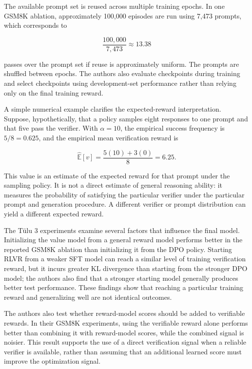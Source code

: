 The available prompt set is reused across multiple training epochs. In one
GSM8K ablation, approximately 100,000 episodes are run using 7,473 prompts,
which corresponds to

\begin{equation}
    \frac{100{,}000}{7{,}473}
    \approx 13.38
    \label{eq:rlvr-prompt-reuse}
\end{equation}

passes over the prompt set if reuse is approximately uniform. The prompts
are shuffled between epochs. The authors also evaluate checkpoints during
training and select checkpoints using development-set performance rather
than relying only on the final training reward.

A simple numerical example clarifies the expected-reward interpretation.
Suppose, hypothetically, that a policy samples eight responses to one prompt
and that five pass the verifier. With \(\alpha=10\), the empirical success
frequency is \(5/8=0.625\), and the empirical mean verification reward is

\begin{equation}
    \widehat{\mathbb{E}}[v]
    =
    \frac{5(10)+3(0)}{8}
    =
    6.25.
    \label{eq:rlvr-worked-reward}
\end{equation}

This value is an estimate of the expected reward for that prompt under the
sampling policy. It is not a direct estimate of general reasoning ability:
it measures the probability of satisfying the particular verifier under the
particular prompt and generation procedure. A different verifier or prompt
distribution can yield a different expected reward.

The Tülu 3 experiments examine several factors that influence the final
model. Initializing the value model from a general reward model performs
better in the reported GSM8K ablation than initializing it from the DPO
policy. Starting RLVR from a weaker SFT model can reach a similar level of
training verification reward, but it incurs greater KL divergence than
starting from the stronger DPO model; the authors also find that a stronger
starting model generally produces better test performance. These findings
show that reaching a particular training reward and generalizing well are
not identical outcomes.

The authors also test whether reward-model scores should be added to
verifiable rewards. In their GSM8K experiments, using the verifiable reward
alone performs better than combining it with reward-model scores, while the
combined signal is noisier. This result supports the use of a direct
verification signal when a reliable verifier is available, rather than
assuming that an additional learned score must improve the optimization
signal.

